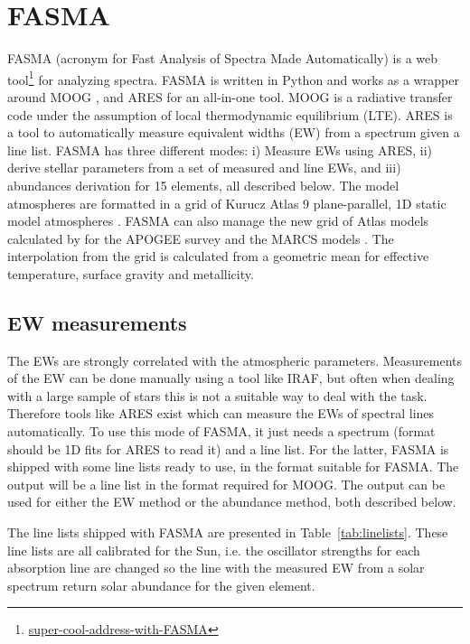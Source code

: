 \documentclass{aa}
\begin{document}
\section{FASMA}
\label{sec:FASMA}
FASMA (acronym for Fast Analysis of Spectra Made Automatically) is a web
tool\footnote{\url{super-cool-address-with-FASMA}} for analyzing spectra. FASMA
is written in Python and works as a wrapper around MOOG
\citep[][version 2014]{Sneden1973}, and ARES \citep{Sousa2015a} for an all-in-one
tool. MOOG is a radiative transfer code under the assumption of local
thermodynamic equilibrium (LTE). ARES is a tool to automatically measure
equivalent widths (EW) from a spectrum given a line list. FASMA has three
different modes: i) Measure EWs using ARES, ii) derive stellar parameters from a
set of measured  and  line EWs, and iii) abundances
derivation for 15 elements, all described below. The model atmospheres are
formatted in a grid of Kurucz Atlas 9 plane-parallel, 1D static model
atmospheres \citet{Kurucz1993}. FASMA can also manage the new grid of Atlas
models calculated by \citet{Meszaros2012} for the APOGEE survey and the MARCS
models \citep{Gustafson2008}. The interpolation from the grid is calculated from
a geometric mean for effective temperature, surface gravity and metallicity.



\subsection{EW measurements}
\label{sub:EW_measurements}
The EWs are strongly correlated with the atmospheric parameters. Measurements of
the EW can be done manually using a tool like IRAF, but often when dealing with
a large sample of stars this is not a suitable way to deal with the task.
Therefore tools like ARES exist which can measure the EWs of spectral lines
automatically. To use this mode of FASMA, it just needs a spectrum (format
should be 1D fits for ARES to read it) and a line list. For the latter, FASMA is
shipped with some line lists ready to use, in the format suitable for FASMA. The
output will be a line list in the format required for MOOG. The output can be
used for either the EW method or the abundance method, both described below.

The line lists shipped with FASMA are presented in Table~\ref{tab:linelists}.
These line lists are all calibrated for the Sun, i.e. the oscillator strengths
for each absorption line are changed so the line with the measured EW from a
solar spectrum return solar abundance for the given element.
\end{document}
